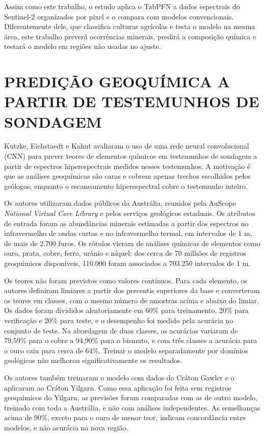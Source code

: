 Assim como este trabalho, o estudo aplica o TabPFN a dados espectrais do Sentinel-2 organizados por pixel e o compara com modelos convencionais. Diferentemente dele, que classifica culturas agrícolas e testa o modelo na mesma área, este trabalho preverá ocorrências minerais, predirá a composição química e testará o modelo em regiões não usadas no ajuste.

\section{PREDIÇÃO GEOQUÍMICA A PARTIR DE TESTEMUNHOS DE SONDAGEM}

Kutzke, Eichstaedt e Kahnt \cite{kutzke2022} avaliaram o uso de uma rede neural convolucional (CNN) para prever teores de elementos químicos em testemunhos de sondagem a partir de espectros hiperespectrais medidos nesses testemunhos. A motivação é que as análises geoquímicas são caras e cobrem apenas trechos escolhidos pelos geólogos, enquanto o escaneamento hiperespectral cobre o testemunho inteiro.

Os autores utilizaram dados públicos da Austrália, reunidos pela AuScope \textit{National Virtual Core Library} e pelos serviços geológicos estaduais. Os atributos de entrada foram as abundâncias minerais estimadas a partir dos espectros no infravermelho de ondas curtas e no infravermelho termal, em intervalos de 1 m, de mais de 2.700 furos. Os rótulos vieram de análises químicas de elementos como ouro, prata, cobre, ferro, urânio e níquel: dos cerca de 70 milhões de registros geoquímicos disponíveis, 110.000 foram associados a 703.250 intervalos de 1 m.

Os teores não foram previstos como valores contínuos. Para cada elemento, os autores definiram limiares a partir dos percentis superiores da base e converteram os teores em classes, com o mesmo número de amostras acima e abaixo do limiar. Os dados foram divididos aleatoriamente em 60\% para treinamento, 20\% para verificação e 20\% para teste, e o desempenho foi medido pela acurácia no conjunto de teste. Na abordagem de duas classes, as acurácias variaram de 79,59\% para o cobre a 94,90\% para o bismuto, e com três classes a acurácia para o ouro caiu para cerca de 64\%. Treinar o modelo separadamente por domínios geológicos não melhorou significativamente os resultados.

Os autores também treinaram o modelo com dados do Cráton Gawler e o aplicaram ao Cráton Yilgarn. Como essa aplicação foi feita sem registros geoquímicos do Yilgarn, as previsões foram comparadas com as de outro modelo, treinado com toda a Austrália, e não com análises independentes. As semelhanças acima de 90\%, exceto para o ouro de menor teor, indicam concordância entre modelos, e não acurácia na nova região.


